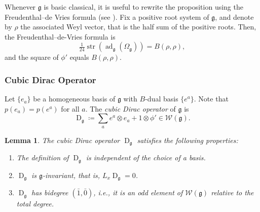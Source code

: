 \documentclass[11pt]{amsart}
\newcommand{\str}{\operatorname{str}}
\newcommand{\ad}{\operatorname{ad}}
\newcommand{\Dirac}{\operatorname{D}}
\def\Weil{{\mathcal{W}(\gg)}}
\def\gg{{\mathfrak{g}}}
\theoremstyle{plain}
\newtheorem{lemma}[theorem]{Lemma}
\theoremstyle{remark}
\theoremstyle{definition}
\numberwithin{equation}{section}
\theoremstyle{remark}
\begin{document}
Whenever $\gg$ is basic classical, it is useful to rewrite the proposition using the Freudenthal–de Vries formula (see \cite{Meyer}). Fix a positive root system of $\gg$, and denote by $\rho$ the associated Weyl vector, that is the half sum of the positive roots. Then, the Freudenthal--de-Vries formula is
\begin{equation} \label{eq::Freudenthal_de_Vries_fd}
 \tfrac{1}{24}\str(\ad_{\gg}(\Omega_{\gg}))=B(\rho, \rho),
\end{equation}
and the square of $\phi'$ equals $B(\rho,\rho)$.

\subsubsection{Cubic Dirac Operator} Let $\{e_{a}\}$ be a homogeneous basis of $\gg$ with $B$-dual basis $\{e^{a}\}$. Note that $p(e_{a})=p(e^{a})$ for all $a$. The \emph{cubic Dirac operator} of $\gg$ is 
\begin{equation}
\Dirac_{\gg}\coloneqq \sum_{a}e^{a}\otimes e_{a}+1\otimes\phi'\in\mathcal{W}(\gg).
\end{equation}

\begin{lemma} \label{lemm::properies_D_l}
 The cubic Dirac operator $\Dirac_{\gg}$ satisfies the following properties:
 \begin{enumerate}
 \item[a)] The definition of $\Dirac_{\gg}$ is independent of the choice of a basis.
 \item[b)] $\Dirac_{\gg}$ is $\gg$-invariant, that is, $L_{x}\Dirac_{\gg}=0$.
 \item[c)] $\Dirac_{\gg}$ has bidegree $(\bar{1},\bar{0})$, \emph{i.e.}, it is an odd element of $\Weil$ relative to the total degree.
 \end{enumerate}
\end{lemma}
\end{document}
